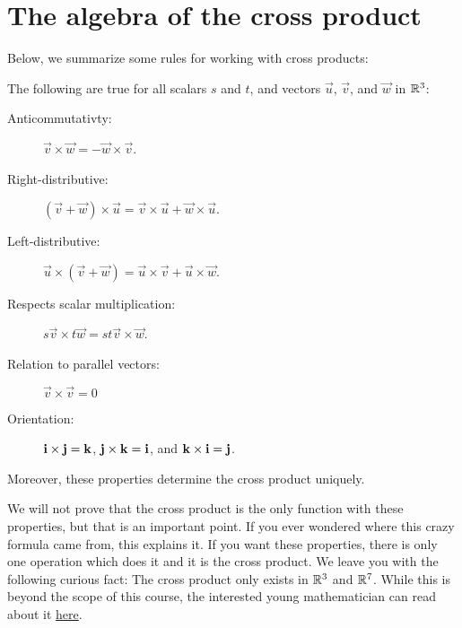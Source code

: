 \documentclass{ximera}
\begin{document}
\section{The algebra of the cross product}


Below, we summarize some rules for working with cross products:

\begin{theorem}  The following are true for all scalars $s$ and $t$,  and vectors
  $\vec{u}$, $\vec{v}$, and $\vec{w}$ in $\mathbb R^3$:
  \begin{description}
  \item[Anticommutativty:] $\vec{v} \times \vec{w}  = -\vec{w} \times \vec{v}$.
  \item[Right-distributive:] $(\vec{v}+\vec{w}) \times \vec{u} = \vec{v} \times \vec{u}+\vec{w} \times \vec{u}$.
  \item[Left-distributive:] $\vec{u} \times (\vec{v} +\vec{w}) = \vec{u} \times \vec{v}+\vec{u}\times\vec{w}$.
  \item[Respects scalar multiplication:] $s\vec{v} \times t\vec{w} = st \vec{v} \times \vec{w}$.
  \item[Relation to parallel vectors:] $\vec{v} \times \vec{v} = 0$
  \item[Orientation:] $\mathbf{i} \times \mathbf{j} = \mathbf{k}$, $\mathbf{j} \times \mathbf{k} = \mathbf{i}$, and $\mathbf{k} \times \mathbf{i} = \mathbf{j}$. 
  \end{description}
  Moreover, these properties determine the cross product uniquely.
\end{theorem}

We will not prove that the cross product is the only function with
these properties, but that is an important point.  If you ever
wondered where this crazy formula came from, this explains it.  If you
want these properties, there is only one operation which does it and
it is the cross product. We leave you with the following curious fact:
The cross product only exists in $\mathbb R^3$ and $\mathbb R^7$. While this is
beyond the scope of this course, the interested young mathematician can read about it \href{http://www.jstor.org/discover/10.2307/2323537}{here}.
\end{document}
